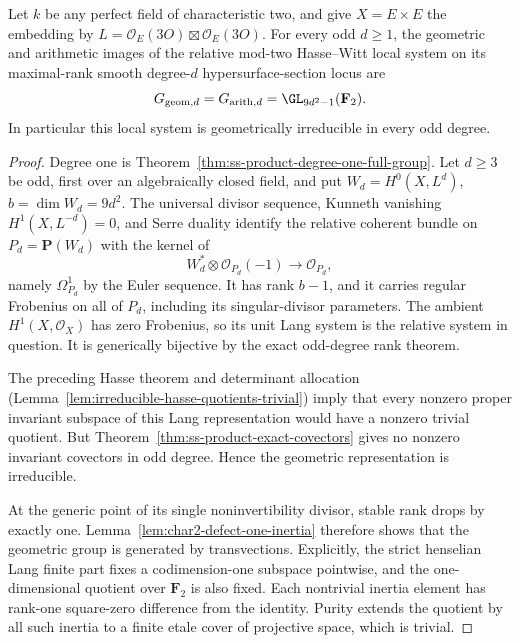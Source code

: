 \begin{theorem}
\label{thm:ss-all-odd-full-groups}
Let $k$ be any perfect field of characteristic two, and give
$X=E\times E$ the embedding by
$L=\mathcal O_E(3O)\boxtimes\mathcal O_E(3O)$.
For every odd $d\ge1$, the geometric and arithmetic images of
the relative mod-two Hasse--Witt local system on its maximal-rank
smooth degree-$d$ hypersurface-section locus are
\[
 G_{\mathrm{geom},d}=G_{\mathrm{arith},d}
          =\GL_{9d^2-1}(\mathbf F_2).
\]
In particular this local system is geometrically irreducible in
every odd degree.
\end{theorem}

\begin{proof}
Degree one is Theorem~\ref{thm:ss-product-degree-one-full-group}.
Let $d\ge3$ be odd, first over an algebraically closed field,
and put $W_d=H^0(X,L^d)$, $b=\dim W_d=9d^2$.
The universal divisor sequence, Kunneth vanishing
$H^1(X,L^{-d})=0$, and Serre duality identify the relative
coherent bundle on $P_d=\mathbf P(W_d)$ with the kernel of
\[
 W_d^*\otimes\mathcal O_{P_d}(-1)
                  \longrightarrow\mathcal O_{P_d},
\]
namely $\Omega^1_{P_d}$ by the Euler sequence.
It has rank $b-1$, and it carries regular Frobenius on all of
$P_d$, including its singular-divisor parameters. The ambient
$H^1(X,\mathcal O_X)$ has zero Frobenius, so its unit Lang system
is the relative system in question. It is generically bijective
by the exact odd-degree rank theorem.

The preceding Hasse theorem and determinant allocation
(Lemma~\ref{lem:irreducible-hasse-quotients-trivial}) imply that
every nonzero proper invariant subspace of this Lang
representation would have a nonzero trivial quotient.
But Theorem~\ref{thm:ss-product-exact-covectors} gives no nonzero
invariant covectors in odd degree. Hence the geometric
representation is irreducible.

At the generic point of its single noninvertibility divisor,
stable rank drops by exactly one. Lemma~\ref{lem:char2-defect-one-inertia}
therefore shows that the geometric group is generated by
transvections. Explicitly, the strict henselian Lang finite part
fixes a codimension-one subspace pointwise, and the one-dimensional
quotient over $\mathbf F_2$ is also fixed. Each nontrivial inertia
element has rank-one square-zero difference from the identity.
Purity extends the quotient by all such inertia to a finite etale
cover of projective space, which is trivial.


\end{proof}
